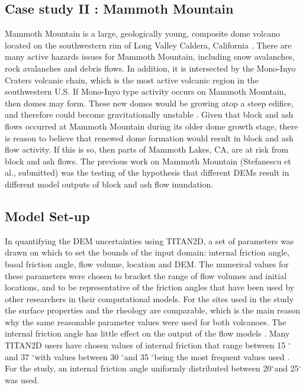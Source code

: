 \documentclass[12pt]{article}
\newcommand{\Deg}{$^{\circ}$}
\begin{document}
\subsection{Case study II : Mammoth Mountain}

Mammoth Mountain is a large, geologically young, composite dome
volcano located on the southwestern rim of Long Valley Caldera,
California \citep{Bailey1989}.  There are many active hazards issues
for Mammoth Mountain, including snow avalanches, rock avalanches and
debris flows. In addition, it is intersected by the Mono-Inyo Craters
volcanic chain, which is the most active volcanic region in the
southwestern U.S.  If Mono-Inyo type activity occurs on Mammoth
Mountain, then domes may form.  These new domes would be growing atop
a steep edifice, and therefore could become gravitationally unstable \citep{Wes2004169, Smith_Mammoth}.
Given that block and ash flows occurred at Mammoth Mountain during its
older dome growth stage, there is reason to believe that renewed dome
formation would result in block and ash flow activity. If this is so,
then parts of Mammoth Lakes, CA, are at risk from block and ash flows.
The previous work on Mammoth Mountain (Stefanescu et al., submitted)
was the testing of the hypothesis that different DEMs result in
different model outputs of block and ash flow inundation.

\subsection{Model Set-up}
\label{subsec: Model Set-up}
In quantifying the DEM uncertainties using TITAN2D, a set
of parameters was drawn on which to set the bounds of the input
domain: internal friction angle, basal friction angle, flow volume,
location and DEM. The numerical values for these parameters were
chosen to bracket the range of flow volumes and initial locations, and
to be representative of the friction angles that have been used by
other researchers in their computational models. 
For the sites used in the study the surface properties and the rheology are 
comparable, which is the main reason why the same reasonable
parameter values were used for both volcanoes.%
The internal friction angle has little effect on the output of the flow
models \citep{Keith, sheridan_2005}. Many TITAN2D users have chosen
values of internal friction that range between 15 \Deg and 37 \Deg with
values between 30 \Deg and 35 \Deg being the most frequent values used
\citep{Patra2005, murcia_2010}.  For the study, an internal
friction angle uniformly distributed between 20\Deg and 25\Deg was used.
\end{document}
